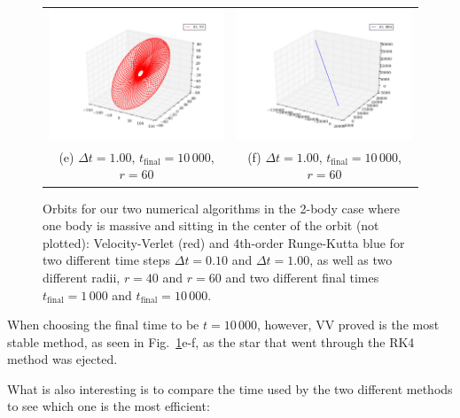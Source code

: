 \documentclass{article}
\begin{document}
\begin{multicols}{2}
\begin{figure}
\begin{center}
\begin{tabular}{cc}
	\includegraphics[width=90mm]{Images/VV_longtime.png}
	& \includegraphics[width=90mm]{Images/RK_longtime.png} \\
	(e) $\Delta t = 1.00$, $t_{\mathrm{final}} = 10\,000$, $r = 60$				& (f) $\Delta t = 1.00$, $t_{\mathrm{final}} = 10\,000$, $r = 60$  \\[6pt]
\end{tabular}
\caption{Orbits for our two numerical algorithms in the 2-body case where one body is massive and sitting in the center of the orbit (not plotted): Velocity-Verlet (red) and 4th-order Runge-Kutta blue for two different time steps $\Delta t = 0.10$ and $\Delta t = 1.00$, as well as two different radii, $r = 40$ and $r = 60$ and two different final times $t_{\mathrm{final}} = 1\,000$ and $t_{\mathrm{final}} = 10\,000$.}\label{fig:2_body}
\end{center}
\end{figure}
When choosing the final time to be $t = 10\,000$, however, VV proved is the most stable method, as seen in Fig.~\ref{fig:2_body}e-f, as the star that went through the RK4 method was ejected. 

What is also interesting is to compare the time used by the two different methods to see which one is the most efficient:


\end{multicols}
\end{document}
